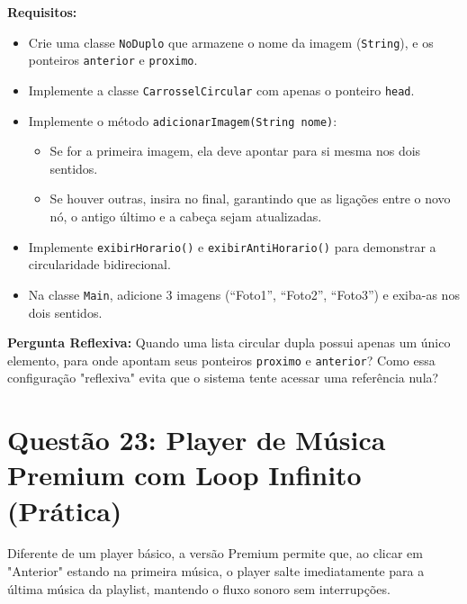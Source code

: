 \documentclass[12pt, a4paper]{article}
\begin{document}
\textbf{Requisitos:}
\begin{itemize}
    \item Crie uma classe \texttt{NoDuplo} que armazene o nome da imagem (\texttt{String}), e os ponteiros \texttt{anterior} e \texttt{proximo}.
    \item Implemente a classe \texttt{CarrosselCircular} com apenas o ponteiro \texttt{head}.
    \item Implemente o método \texttt{adicionarImagem(String nome)}:
    \begin{itemize}
        \item Se for a primeira imagem, ela deve apontar para si mesma nos dois sentidos.
        \item Se houver outras, insira no final, garantindo que as ligações entre o novo nó, o antigo último e a cabeça sejam atualizadas.
    \end{itemize}
    \item Implemente \texttt{exibirHorario()} e \texttt{exibirAntiHorario()} para demonstrar a circularidade bidirecional.
    \item Na classe \texttt{Main}, adicione 3 imagens (``Foto1'', ``Foto2'', ``Foto3'') e exiba-as nos dois sentidos.
\end{itemize}

\textbf{Pergunta Reflexiva:} Quando uma lista circular dupla possui apenas um único elemento, para onde apontam seus ponteiros \texttt{proximo} e \texttt{anterior}? Como essa configuração "reflexiva" evita que o sistema tente acessar uma referência nula?

\vspace{0.2cm}

\section*{Questão 23: Player de Música Premium com Loop Infinito (Prática)}
Diferente de um player básico, a versão Premium permite que, ao clicar em "Anterior" estando na primeira música, o player salte imediatamente para a última música da playlist, mantendo o fluxo sonoro sem interrupções.
\end{document}
